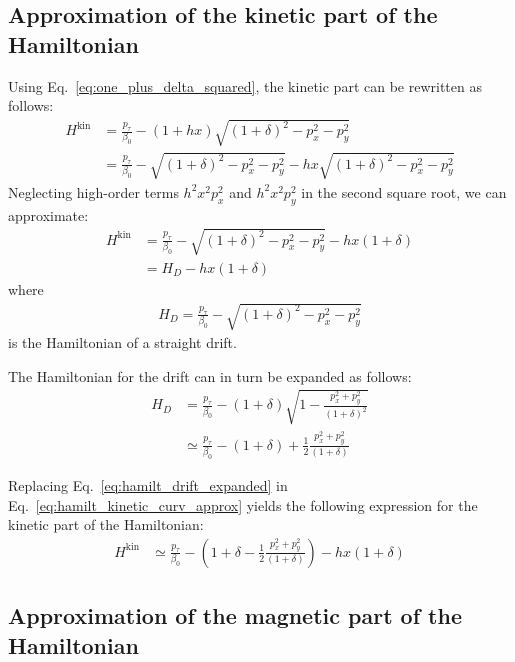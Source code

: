\subsection{Approximation of the kinetic part of the Hamiltonian}

Using Eq.~\ref{eq:one_plus_delta_squared}, the kinetic part can be rewritten as follows:
\begin{align}
  H^\text{kin}
    &= \frac{p_\tau}{\beta_0} - (1+h x) \sqrt{ (1 + \delta)^2  - p_x^2 - p_y^2}\\
    &= \frac{p_\tau}{\beta_0} - \sqrt{ (1 + \delta)^2 - p_x^2 - p_y^2}
                              - h x \sqrt{ (1 + \delta)^2  - p_x^2 - p_y^2}
\end{align}
Neglecting high-order terms $h^2 x^2 p_x^2$ and $h^2 x^2 p_y^2$ in the second
square root, we can approximate:
\begin{align}
  H^\text{kin}
    &= \frac{p_\tau}{\beta_0} - \sqrt{ (1 + \delta)^2 - p_x^2 - p_y^2} - h x (1 + \delta)\\
    &= H_D - h x (1 + \delta)
    \label{eq:hamilt_kinetic_curv_approx}
\end{align}
where
\begin{align}
  H_D = \frac{p_\tau}{\beta_0} - \sqrt{ (1 + \delta)^2 - p_x^2 - p_y^2}
\end{align}
is the Hamiltonian of a straight drift.

The Hamiltonian for the drift can in turn be expanded as follows:
\begin{align}
  H_D &= \frac{p_\tau}{\beta_0} - (1 + \delta)\sqrt{1  - \frac{p_x^2 + p_y^2}{(1 + \delta)^2}}\\
      &\simeq \frac{p_\tau}{\beta_0} - (1 + \delta) + \frac{1}{2}\frac{p_x^2 + p_y^2}{(1 + \delta)}
      \label{eq:hamilt_drift_expanded}
\end{align}

Replacing Eq.~\eqref{eq:hamilt_drift_expanded} in Eq.~\eqref{eq:hamilt_kinetic_curv_approx}
yields the following expression for the kinetic part of the Hamiltonian:
\begin{align}
  H^\text{kin}
    &\simeq  \frac{p_\tau}{\beta_0}
    - \left(1 + \delta  - \frac{1}{2}\frac{p_x^2 + p_y^2}{(1 + \delta)}\right)
    - h x \left(1 + \delta\right)
\end{align}

\subsection{Approximation of the magnetic part of the Hamiltonian}

